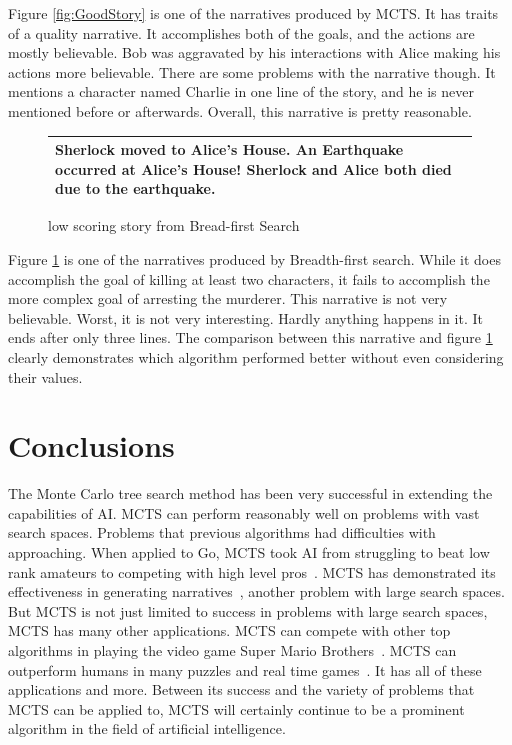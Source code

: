 \documentclass{sig-alternate}
\begin{document}
Figure \ref{fig:GoodStory} is one of the narratives produced by MCTS. It has traits of a quality narrative. It accomplishes both of the goals, and the actions are mostly believable. Bob was aggravated by his interactions with Alice making his actions more believable. There are some problems with the narrative though. It mentions a character named Charlie in one line of the story, and he is never mentioned before or afterwards. Overall, this narrative is pretty reasonable.

\begin{figure}[h]
\begin{tabular}{|p{8cm}|}
\hline
Sherlock moved to Alice's House. An Earthquake occurred at Alice's House! Sherlock and Alice both died due to the earthquake. \\ \hline
\end{tabular}
\centering
\caption{low scoring story from Bread-first Search}
\label{fig:BadStory}
\end{figure}

Figure \ref{fig:BadStory} is one of the narratives produced by Breadth-first search. While it does accomplish the goal of killing at least two characters, it fails to accomplish the more complex goal of arresting the murderer. This narrative is not very believable. Worst, it is not very interesting. Hardly anything happens in it. It ends after only three lines. The comparison between this narrative and figure \ref{fig:BadStory} clearly demonstrates which algorithm performed better without even considering their values. 

\section{Conclusions}
The Monte Carlo tree search method has been very successful in extending the capabilities of AI. MCTS can perform reasonably well on problems with vast search spaces. Problems that previous algorithms had difficulties with approaching. When applied to Go, MCTS took AI from struggling to beat low rank amateurs to competing with high level pros~\cite{TheGrandChallenge}. MCTS has demonstrated its effectiveness in generating narratives~\cite{TheGrandChallenge}, another problem with large search spaces. But MCTS is not just limited to success in problems with large search spaces, MCTS has many other applications. MCTS can compete with other top algorithms in playing the video game Super Mario Brothers~\cite{Jacobsen:2014}. MCTS can outperform humans in many puzzles and real time games~\cite{Narrative}. It has all of these applications and more. Between its success and the variety of problems that MCTS can be applied to, MCTS will certainly continue to be a prominent algorithm in the field of artificial intelligence.
\end{document}
